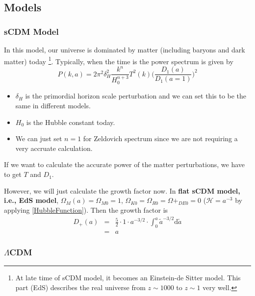 \subsection{Models}
\subsubsection{sCDM Model}

In this model, our universe is dominated by matter (including baryons and dark matter) today {\footnote{
At late time of sCDM model, it becomes an Einstein-de Sitter model. This part (EdS) describes the real universe from $z\sim 1000$ to $z\sim 1$ very well.
}}. Typically, when the time is the power spectrum is given by
\begin{equation}
P(k,a)=2\pi^2\delta_H^2\frac{k^n}{H_0^{n+3}}T^2(k)\bigg(\frac{D_1(a)}{D_1(a=1)}\bigg)^2
\end{equation}


\begin{itemize}

\item 
$\delta_H$ is the primordial horizon scale perturbation and we can set this to be the same in different models.

\item 
$H_0$ is the Hubble constant today.

\item
We can just set $n=1$ for Zeldovich spectrum since we are not requiring a very accruate calculation.

\end{itemize}




If we want to calculate the accurate power of the matter perturbations, we have to get $T$ and $D_1$.

However, we will just calculate the growth factor now. 
In {\bf flat sCDM model, i.e., EdS model}, $\Omega_M(a)=\Omega_{M0}=1$, $\Omega_{K0}=\Omega_{R0}=\Omega+_{DE0}=0$ ($\mathscr H=a^{-3}$ by applying \ref{HubbleFunction}). Then the growth factor is
\begin{eqnarray}
D_+(a)
&=&\frac 5 2 \cdot 1 \cdot a^{-3/2} \cdot \int^a_0 {\tilde a}^{-3/2}\mathrm d \tilde a   \\
&=&a
\end{eqnarray}






\subsubsection{$\Lambda$CDM}

